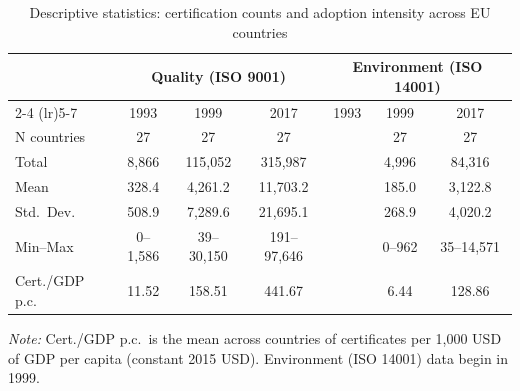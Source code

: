\begin{table}[H]\centering
\caption{Descriptive statistics: certification counts and adoption intensity across EU countries}
\label{tab:desc_stats}
\begin{tabular}{lcccccc}\hline\hline
& \multicolumn{3}{c}{Quality (ISO 9001)} & \multicolumn{3}{c}{Environment (ISO 14001)} \\
\cmidrule(lr){2-4} \cmidrule(lr){5-7}
& 1993 & 1999 & 2017 & 1993 & 1999 & 2017 \\\hline
N countries & 27 & 27 & 27 & & 27 & 27 \\
Total & 8,866 & 115,052 & 315,987 & & 4,996 & 84,316 \\
Mean & 328.4 & 4,261.2 & 11,703.2 & & 185.0 & 3,122.8 \\
Std.\ Dev. & 508.9 & 7,289.6 & 21,695.1 & & 268.9 & 4,020.2 \\
Min--Max & 0--1,586 & 39--30,150 & 191--97,646 & & 0--962 & 35--14,571 \\
Cert./GDP p.c. & 11.52 & 158.51 & 441.67 & & 6.44 & 128.86 \\
\hline\hline\end{tabular}
\parbox{\textwidth}{\footnotesize \textit{Note:} Cert./GDP p.c.\ is the mean across countries of certificates per 1{,}000 USD of GDP per capita (constant 2015 USD). Environment (ISO 14001) data begin in 1999.}
\end{table}
